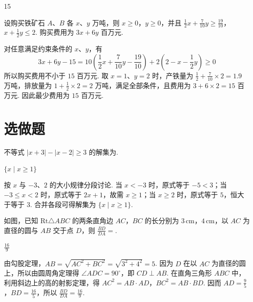 \begin{answer}
15
\end{answer}

\begin{solution}
设购买铁矿石 \(A\)、\(B\) 各 \(x\)、\(y\) 万吨，则 \(x\geqslant0\)，\(y\geqslant0\)，并且 \(\frac12x+\frac7{10}y\geqslant\frac{19}{10}\)，\(x+\frac12y\leqslant2\). 购买费用为 \(3x+6y\) 百万元.

对任意满足约束条件的 \(x\)、\(y\)，有
\[
3x+6y-15=10\left(\frac12x+\frac7{10}y-\frac{19}{10}\right)+2\left(2-x-\frac12y\right)\geqslant0
\]
所以购买费用不小于 \(15\) 百万元. 取 \(x=1\)、\(y=2\) 时，产铁量为 \(\frac12+\frac7{10}\times2=1.9\) 万吨，排放量为 \(1+\frac12\times2=2\) 万吨，满足全部条件，且费用为 \(3+6\times2=15\) 百万元. 因此最少费用为 \(15\) 百万元.
\end{solution}

\section{选做题}

\begin{problem}[A]
不等式 \(|x + 3| - |x - 2| \geqslant 3\) 的解集为\fillinblank{}.
\end{problem}

\begin{answer}
\(\{x \mid x \geqslant 1\}\)
\end{answer}

\begin{solution}
按 \(x\) 与 \(-3\)、\(2\) 的大小规律分段讨论. 当 \(x<-3\) 时，原式等于 \(-5<3\)；当 \(-3\leqslant x<2\) 时，原式等于 \(2x+1\)，故需 \(x\geqslant1\)；当 \(x\geqslant2\) 时，原式等于 \(5\)，恒大于等于 \(3\). 合并各段可得解集为 \(\{x\mid x\geqslant1\}\).
\end{solution}

\reuseproblemnumber
\begin{problem}[B]
如图，已知 \(\mathrm{Rt}\triangle ABC\) 的两条直角边 \(AC\)，\(BC\) 的长分别为 \(3\,\mathrm{cm}\)，\(4\,\mathrm{cm}\)，以 \(AC\) 为直径的圆与 \(AB\) 交于点 \(D\)，则 \(\frac{BD}{DA} = \)\fillinblank{}.

\end{problem}

\begin{answer}
\(\frac{16}{9}\)
\end{answer}

\begin{solution}
由勾股定理，\(AB=\sqrt{AC^2+BC^2}=\sqrt{3^2+4^2}=5\). 因为 \(D\) 在以 \(AC\) 为直径的圆上，所以由圆周角定理得 \(\angle ADC=90^\circ\)，即 \(CD\perp AB\). 在直角三角形 \(ABC\) 中，利用斜边上的高的射影定理，得 \(AC^2=AB\cdot AD\)，\(BC^2=AB\cdot BD\). 因而 \(AD=\frac95\)，\(BD=\frac{16}{5}\)，所以 \(\frac{BD}{DA}=\frac{16}{9}\).
\end{solution}

